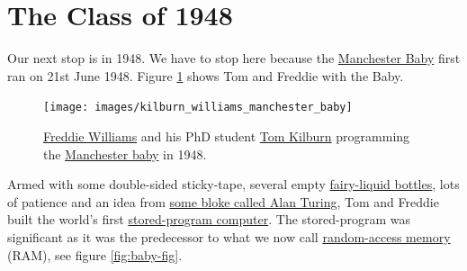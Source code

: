 \documentclass[
  12pt,
]{book}
\begin{document}
\hypertarget{y1948}{%
\section{The Class of 1948}\label{y1948}}

Our next stop is in 1948. We have to stop here because the \href{https://en.wikipedia.org/wiki/Manchester_Baby}{Manchester Baby} first ran on 21st June 1948. Figure \ref{fig:tomfred-fig} shows Tom and Freddie with the Baby. \citep{lavington}

\begin{figure}

{\centering \texttt{[image: images/kilburn\_williams\_manchester\_baby]} 

}

\caption{\href{https://en.wikipedia.org/wiki/Frederic_Calland_Williams}{Freddie Williams} and his PhD student \href{https://en.wikipedia.org/wiki/Tom_Kilburn}{Tom Kilburn} programming the \href{https://en.wikipedia.org/wiki/Manchester_Baby}{Manchester baby} in 1948.}\label{fig:tomfred-fig}
\end{figure}



Armed with some double-sided sticky-tape, several empty \href{https://en.wikipedia.org/wiki/Fairy_(brand)}{fairy-liquid bottles}, lots of patience and an idea from \href{https://en.wikipedia.org/wiki/Alan_Turing}{some bloke called Alan Turing}, Tom and Freddie built the world's first \href{https://en.wikipedia.org/wiki/Stored-program_computer}{stored-program computer}. The stored-program was significant as it was the predecessor to what we now call \href{https://en.wikipedia.org/wiki/Random-access_memory}{random-access memory} (RAM), see figure \ref{fig:baby-fig}. \citep{longway-baby}
\end{document}
